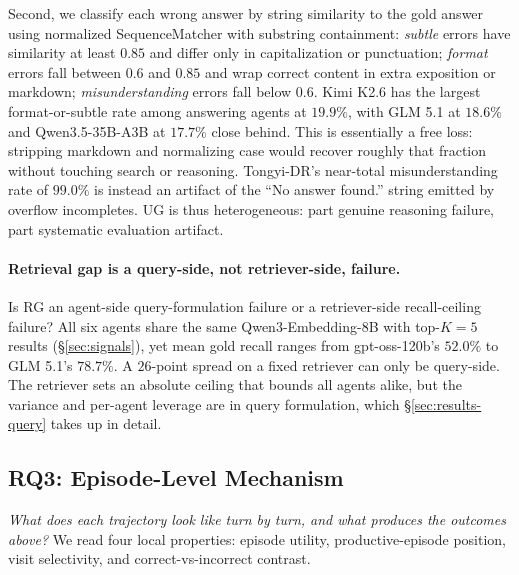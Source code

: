 Second, we classify each wrong answer by string similarity to the gold answer using normalized SequenceMatcher with substring containment: \emph{subtle} errors have similarity at least $0.85$ and differ only in capitalization or punctuation; \emph{format} errors fall between $0.6$ and $0.85$ and wrap correct content in extra exposition or markdown; \emph{misunderstanding} errors fall below $0.6$. Kimi K2.6 has the largest format-or-subtle rate among answering agents at $19.9\%$, with GLM 5.1 at $18.6\%$ and Qwen3.5-35B-A3B at $17.7\%$ close behind. This is essentially a free loss: stripping markdown and normalizing case would recover roughly that fraction without touching search or reasoning. Tongyi-DR's near-total misunderstanding rate of $99.0\%$ is instead an artifact of the ``No answer found.'' string emitted by overflow incompletes. UG is thus heterogeneous: part genuine reasoning failure, part systematic evaluation artifact.

\paragraph{Retrieval gap is a query-side, not retriever-side, failure.} Is RG an agent-side query-formulation failure or a retriever-side recall-ceiling failure? All six agents share the same Qwen3-Embedding-8B with top-$K{=}5$ results (§\ref{sec:signals}), yet mean gold recall ranges from gpt-oss-120b's $52.0\%$ to GLM 5.1's $78.7\%$. A $26$-point spread on a fixed retriever can only be query-side. The retriever sets an absolute ceiling that bounds all agents alike, but the variance and per-agent leverage are in query formulation, which §\ref{sec:results-query} takes up in detail.

\subsection{RQ3: Episode-Level Mechanism}
\label{sec:results-mechanism}
\label{sec:results-efficiency}
\label{sec:results-utility}

\emph{What does each trajectory look like turn by turn, and what produces the outcomes above?} We read four local properties: episode utility, productive-episode position, visit selectivity, and correct-vs-incorrect contrast.

